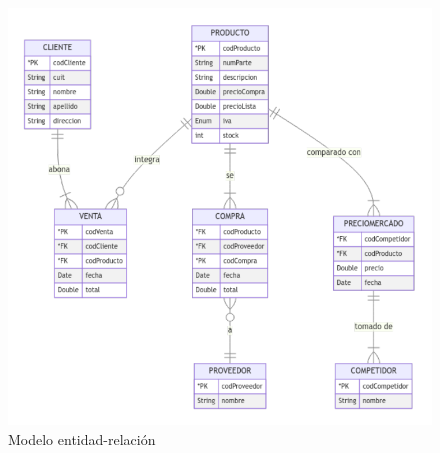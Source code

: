 \begin{figure}[ht]
	\vspace{20pt}
	\centering
	\vspace{15pt}
	\includegraphics[width=\textwidth]{img/02-modelo-entidad-relacion}
	\caption{Modelo entidad-relación}
	\vspace{15pt}
\end{figure}

